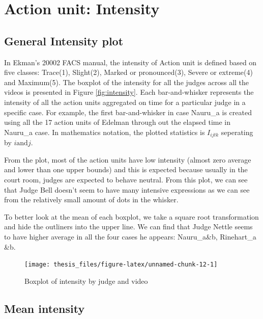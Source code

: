 \documentclass{monashthesis}
\begin{document}
\hypertarget{action-unit-intensity}{%
\section{Action unit: Intensity}\label{action-unit-intensity}}

\hypertarget{general-intensity-plot}{%
\subsection{General Intensity plot}\label{general-intensity-plot}}

In Ekman's 20002 FACS manual, the intensity of Action unit is defined based on five classes: Trace(1), Slight(2), Marked or pronounced(3), Severe or extreme(4) and Maximum(5). The boxplot of the intensity for all the judges across all the videos is presented in Figure \ref{fig:intensity}. Each bar-and-whisker represents the intensity of all the action units aggregated on time for a particular judge in a specific case. For example, the first bar-and-whisker in case Nauru\_a is created using all the 17 action units of Edelman through out the elapsed time in Nauru\_a case. In mathematics notation, the plotted statistics is \(I_{ijtk}\) seperating by \(i \text{and} j\).

From the plot, most of the action units have low intensity (almost zero average and lower than one upper bounds) and this is expected because usually in the court room, judges are expected to behave neutral. From this plot, we can see that Judge Bell doesn't seem to have many intensive expressions as we can see from the relatively small amount of dots in the whisker.

To better look at the mean of each boxplot, we take a square root transformation and hide the outliners into the upper line. We can find that Judge Nettle seems to have higher average in all the four cases he appears: Nauru\_a\&b, Rinehart\_a \&b.

\begin{figure}
\texttt{[image: thesis\_files/figure-latex/unnamed-chunk-12-1]} \caption{Boxplot of intensity by judge and video\label{fig:intensity}}\label{fig:unnamed-chunk-12}
\end{figure}

\hypertarget{mean-intensity}{%
\subsection{Mean intensity}\label{mean-intensity}}
\end{document}
